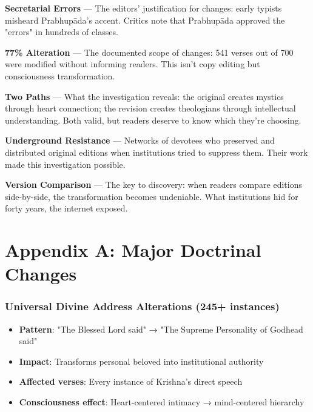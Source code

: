 \documentclass[11pt,twoside]{book}
\begin{document}
\textbf{\textbf{Secretarial Errors}} — The editors' justification for changes: early typists misheard Prabhupāda's accent. Critics note that Prabhupāda approved the "errors" in hundreds of classes.

\textbf{\textbf{77\% Alteration}} — The documented scope of changes: 541 verses out of 700 were modified without informing readers. This isn't copy editing but consciousness transformation.

\textbf{\textbf{Two Paths}} — What the investigation reveals: the original creates mystics through heart connection; the revision creates theologians through intellectual understanding. Both valid, but readers deserve to know which they're choosing.

\textbf{\textbf{Underground Resistance}} — Networks of devotees who preserved and distributed original editions when institutions tried to suppress them. Their work made this investigation possible.

\textbf{\textbf{Version Comparison}} — The key to discovery: when readers compare editions side-by-side, the transformation becomes undeniable. What institutions hid for forty years, the internet exposed.
\part*{Appendix A: Major Doctrinal Changes}
\label{sec:org6d2f2bf}
\thispagestyle{plain}
\section*{Universal Divine Address Alterations (245+ instances)}
\label{sec:org97b8c60}
\begin{itemize}
\item \textbf{\textbf{Pattern}}: "The Blessed Lord said" → "The Supreme Personality of Godhead said"
\item \textbf{\textbf{Impact}}: Transforms personal beloved into institutional authority
\item \textbf{\textbf{Affected verses}}: Every instance of Krishna's direct speech
\item \textbf{\textbf{Consciousness effect}}: Heart-centered intimacy → mind-centered hierarchy
\end{itemize}
\end{document}
